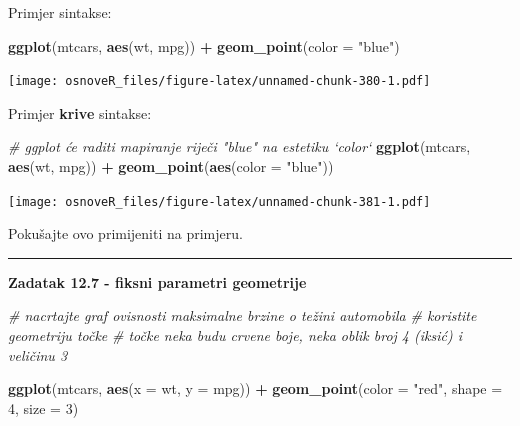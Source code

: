 \documentclass[]{book}
\newenvironment{Shaded}{\begin{snugshade}}{\end{snugshade}}
\newcommand{\KeywordTok}[1]{\textcolor[rgb]{0.13,0.29,0.53}{\textbf{#1}}}
\newcommand{\DataTypeTok}[1]{\textcolor[rgb]{0.13,0.29,0.53}{#1}}
\newcommand{\DecValTok}[1]{\textcolor[rgb]{0.00,0.00,0.81}{#1}}
\newcommand{\StringTok}[1]{\textcolor[rgb]{0.31,0.60,0.02}{#1}}
\newcommand{\CommentTok}[1]{\textcolor[rgb]{0.56,0.35,0.01}{\textit{#1}}}
\newcommand{\OperatorTok}[1]{\textcolor[rgb]{0.81,0.36,0.00}{\textbf{#1}}}
\newcommand{\NormalTok}[1]{#1}
\theoremstyle{definition}
\theoremstyle{definition}
\theoremstyle{definition}
\theoremstyle{remark}
\begin{document}
Primjer sintakse:

\begin{Shaded}
\begin{Highlighting}[]
\KeywordTok{ggplot}\NormalTok{(mtcars, }\KeywordTok{aes}\NormalTok{(wt, mpg)) }\OperatorTok{+}\StringTok{ }\KeywordTok{geom_point}\NormalTok{(}\DataTypeTok{color =} \StringTok{"blue"}\NormalTok{)}
\end{Highlighting}
\end{Shaded}

\texttt{[image: osnoveR\_files/figure-latex/unnamed-chunk-380-1.pdf]}

Primjer \textbf{krive} sintakse:

\begin{Shaded}
\begin{Highlighting}[]
\CommentTok{# ggplot će raditi mapiranje riječi "blue" na estetiku `color`}
\KeywordTok{ggplot}\NormalTok{(mtcars, }\KeywordTok{aes}\NormalTok{(wt, mpg)) }\OperatorTok{+}\StringTok{ }\KeywordTok{geom_point}\NormalTok{(}\KeywordTok{aes}\NormalTok{(}\DataTypeTok{color =} \StringTok{"blue"}\NormalTok{))}
\end{Highlighting}
\end{Shaded}

\texttt{[image: osnoveR\_files/figure-latex/unnamed-chunk-381-1.pdf]}

Pokušajte ovo primijeniti na primjeru.

\begin{center}\rule{0.5\linewidth}{\linethickness}\end{center}

\textbf{Zadatak 12.7 - fiksni parametri geometrije}

\begin{Shaded}
\begin{Highlighting}[]
\CommentTok{# nacrtajte graf ovisnosti maksimalne brzine o težini automobila}
\CommentTok{# koristite geometriju točke}
\CommentTok{# točke neka budu crvene boje, neka oblik broj 4 (iksić) i veličinu 3}
\end{Highlighting}
\end{Shaded}

\begin{Shaded}
\begin{Highlighting}[]
\KeywordTok{ggplot}\NormalTok{(mtcars, }\KeywordTok{aes}\NormalTok{(}\DataTypeTok{x =}\NormalTok{ wt, }\DataTypeTok{y =}\NormalTok{ mpg)) }\OperatorTok{+}\StringTok{ }\KeywordTok{geom_point}\NormalTok{(}\DataTypeTok{color =} \StringTok{"red"}\NormalTok{, }\DataTypeTok{shape =} \DecValTok{4}\NormalTok{, }\DataTypeTok{size =} \DecValTok{3}\NormalTok{)}
\end{Highlighting}
\end{Shaded}
\end{document}
